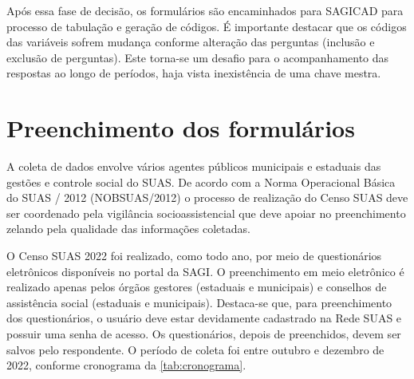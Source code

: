 \documentclass[
  brazilian]{report}
\begin{document}
Após essa fase de decisão, os formulários são encaminhados para SAGICAD
para processo de tabulação e geração de códigos. É importante destacar
que os códigos das variáveis sofrem mudança conforme alteração das
perguntas (inclusão e exclusão de perguntas). Este torna-se um desafio
para o acompanhamento das respostas ao longo de períodos, haja vista
inexistência de uma chave mestra.

\hypertarget{preenchimento-dos-formuluxe1rios}{%
\section{Preenchimento dos
formulários}\label{preenchimento-dos-formuluxe1rios}}

A coleta de dados envolve vários agentes públicos municipais e estaduais
das gestões e controle social do SUAS. De acordo com a Norma Operacional
Básica do SUAS / 2012 (NOBSUAS/2012) o processo de realização do Censo
SUAS deve ser coordenado pela vigilância socioassistencial que deve
apoiar no preenchimento zelando pela qualidade das informações
coletadas.

O Censo SUAS 2022 foi realizado, como todo ano, por meio de
questionários eletrônicos disponíveis no portal da SAGI. O preenchimento
em meio eletrônico é realizado apenas pelos órgãos gestores (estaduais e
municipais) e conselhos de assistência social (estaduais e municipais).
Destaca-se que, para preenchimento dos questionários, o usuário deve
estar devidamente cadastrado na Rede SUAS e possuir uma senha de acesso.
Os questionários, depois de preenchidos, devem ser salvos pelo
respondente. O período de coleta foi entre outubro e dezembro de 2022,
conforme cronograma da \cref{tab:cronograma}.
\end{document}
